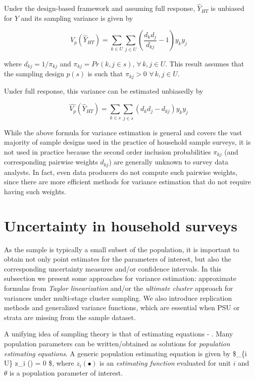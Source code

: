 \documentclass[
  12pt,
]{book}
\begin{document}
Under the design-based framework and assuming full response, \(\widehat Y _{HT}\) is unbiased for \(Y\) and its sampling variance is given by

\[
V_p \left( \widehat{Y}_{HT} \right) = \sum_{k \in U} \sum_{j \in U} \left( \frac {d_k d_j} {d_{kj}} - 1 \right) y_k y_j
\]

where \(d_{kj} = 1 / \pi_{kj}\) and \(\pi_{kj} = Pr(k,j \in s), \, \forall \, k,j \in U\). This result assumes that the sampling design \(p(s)\) is such that \(\pi_{kj} > 0 \,\, \forall \, k,j \in U\).

Under full response, this variance can be estimated unbiasedly by

\[
\widehat {V_p} \left( \widehat{Y}_{HT} \right) = \sum_{k \in s} \sum_{j \in s} \left( d_k d_j - d_{kj} \right) y_k y_j
\]

While the above formula for variance estimation is general and covers the vast majority of sample designs used in the practice of household sample surveys, it is not used in practice because the second order inclusion probabilities \(\pi_{kj}\) (and corresponding pairwise weights \(d_{kj}\)) are generally unknown to survey data analysts. In fact, even data producers do not compute such pairwise weights, since there are more efficient methods for variance estimation that do not require having such weights.

\section{Uncertainty in household surveys}\label{uncertainty-in-household-surveys}

As the sample is typically a small subset of the population, it is important to obtain not only point estimates for the parameters of interest, but also the corresponding uncertainty measures and/or confidence intervals. In this subsection we present some approaches for variance estimation: approximate formulas from \emph{Taylor linearization} and/or the \emph{ultimate cluster} approach for variances under multi-stage cluster sampling. We also introduce replication methods and generalized variance functions, which are essential when PSU or strata are missing from the sample dataset.

A unifying idea of sampling theory is that of estimating equations - \citet{Binder1983}. Many population parameters can be written/obtained as solutions for \emph{population estimating equations}. A generic population estimating equation is given by \$\sum \_\{i \in U\} z\_i (\theta) = 0 \$, where \(z_i(\bullet)\) is an \emph{estimating function} evaluated for unit \(i\) and \(\theta\) is a population parameter of interest.
\end{document}
